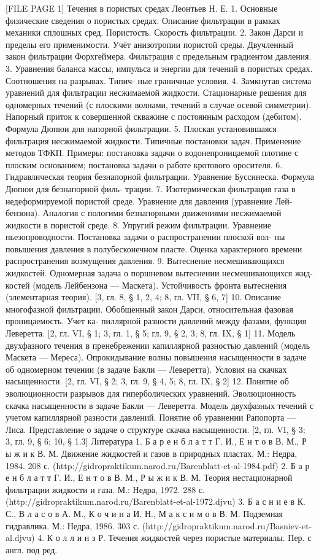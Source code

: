 \documentclass[
  11pt,
]{article}
\begin{document}
{[}FILE PAGE 1{]} Течения в пористых средах Леонтьев Н. Е. 1. Основные физические сведения о пористых средах. Описание фильтрации в рамках механики сплошных сред. Пористость. Скорость фильтрации. 2. Закон Дарси и пределы его применимости. Учёт анизотропии пористой среды. Двучленный закон фильтрации Форхгеймера. Фильтрация с предельным градиентом давления. 3. Уравнения баланса массы, импульса и энергии для течений в пористых средах. Соотношения на разрывах. Типич- ные граничные условия. 4. Замкнутая система уравнений для фильтрации несжимаемой жидкости. Стационарные решения для одномерных течений (с плоскими волнами, течений в случае осевой симметрии). Напорный приток к совершенной скважине с постоянным расходом (дебитом). Формула Дюпюи для напорной фильтрации. 5. Плоская установившаяся фильтрация несжимаемой жидкости. Типичные постановки задач. Применение методов ТФКП. Примеры: постановка задачи о водонепроницаемой плотине с плоским основанием; постановка задачи о работе кротового оросителя. 6. Гидравлическая теория безнапорной фильтрации. Уравнение Буссинеска. Формула Дюпюи для безнапорной филь- трации. 7. Изотермическая фильтрация газа в недеформируемой пористой среде. Уравнение для давления (уравнение Лей- бензона). Аналогия с пологими безнапорными движениями несжимаемой жидкости в пористой среде. 8. Упругий режим фильтрации. Уравнение пьезопроводности. Постановка задачи о распространении плоской вол- ны повышения давления в полубесконечном пласте. Оценка характерного времени распространения возмущения давления. 9. Вытеснение несмешивающихся жидкостей. Одномерная задача о поршневом вытеснении несмешивающихся жид- костей (модель Лейбензона --- Маскета). Устойчивость фронта вытеснения (элементарная теория). {[}3, гл. 8, § 1, 2, 4; 8, гл. VII, § 6, 7{]} 10. Описание многофазной фильтрации. Обобщенный закон Дарси, относительная фазовая проницаемость. Учет ка- пиллярной разности давлений между фазами, функция Леверетта. {[}2, гл. VI, § 1; 3, гл. 1, § 5; гл. 9, § 2, 3; 8, гл. IX, § 1{]} 11. Модель двухфазного течения в пренебрежении капиллярной разностью давлений (модель Маскета --- Мереса). Опрокидывание волны повышения насыщенности в задаче об одномерном течении (в задаче Бакли --- Леверетта). Условия на скачках насыщенности. {[}2, гл. VI, § 2; 3, гл. 9, § 4, 5; 8, гл. IX, § 2{]} 12. Понятие об эволюционности разрывов для гиперболических уравнений. Эволюционность скачка насыщенности в задаче Бакли --- Леверетта. Модель двухфазных течений с учетом капиллярной разности давлений. Понятие об уравнении Рапопорта --- Лиса. Представление о задаче о структуре скачка насыщенности. {[}2, гл. VI, § 3; 3, гл. 9, § 6; 10, § 1.3{]} Литература 1. Б а р е н б л а т т Г. И., Е н т о в В. М., Р ы ж и к В. М. Движение жидкостей и газов в природных пластах. М.: Недра, 1984. 208 с. (http://gidropraktikum.narod.ru/Barenblatt-et-al-1984.pdf) 2. Б а р е н б л а т т Г. И., Е н т о в В. М., Р ы ж и к В. М. Теория нестационарной фильтрации жидкости и газа. М.: Недра, 1972. 288 с. (http://gidropraktikum.narod.ru/Barenblatt-et-al-1972.djvu) 3. Б а с н и е в К. С., В л а с о в А. М., К о ч и н а И. Н., М а к с и м о в В. М. Подземная гидравлика. М.: Недра, 1986. 303 с. (http://gidropraktikum.narod.ru/Basniev-et-al.djvu) 4. К о л л и н з Р. Течения жидкостей через пористые материалы. Пер. с англ. под ред. 
\end{document}
